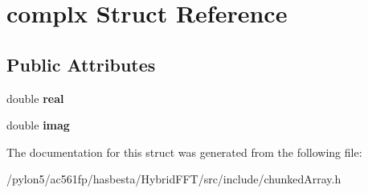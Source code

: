 \hypertarget{structcomplx}{\section{complx Struct Reference}
\label{structcomplx}
}
\subsection*{Public Attributes}
\begin{DoxyCompactItemize}
\item 
\hypertarget{structcomplx_ac35bc7b597898676d78e179c9ddbb3d4}{double {\bfseries real}}\label{structcomplx_ac35bc7b597898676d78e179c9ddbb3d4}

\item 
\hypertarget{structcomplx_ac76d684d1eb0aa7486a292af7c9d5b78}{double {\bfseries imag}}\label{structcomplx_ac76d684d1eb0aa7486a292af7c9d5b78}

\end{DoxyCompactItemize}


The documentation for this struct was generated from the following file\-:\begin{DoxyCompactItemize}
\item 
/pylon5/ac561fp/hasbesta/\-Hybrid\-F\-F\-T/src/include/chunked\-Array.\-h\end{DoxyCompactItemize}
